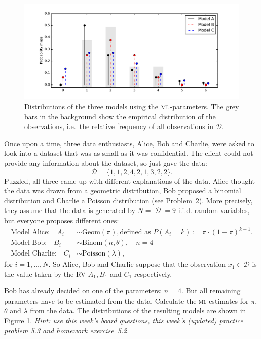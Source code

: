 \documentclass[a4paper,10pt,landscape,twocolumn]{scrartcl}
\begin{document}
\begin{figure}
	\includegraphics[width=.5\textwidth]{05-distributions}
	\caption{Distributions of the three models using the $\textsc{ml}$-parameters. The grey bars in the background show the empirical distribution of the observations, i.e.\ the relative frequency of all observations in $\mathcal{D}$.\label{fig:models}}
\end{figure}


\begin{exercise}
Once upon a time, three data enthusiasts, Alice, Bob and Charlie, were asked to look into a dataset that was as small as it was confidential. The client could not provide any information about the dataset, so just gave the data:
	\[
		\mathcal{D} = \{ 1, 1, 2, 4, 2, 1, 3, 2, 2 \}.
	\]
	Puzzled, all three came up with different explanations of the data. Alice thought the data was drawn from a geometric distribution, Bob proposed a binomial distribution and Charlie a Poisson distribution (see Problem~2). More precisely, they assume that the data is generated by $N = |\mathcal D|=9$ i.i.d. random variables, but everyone proposes different ones:
	\begin{align*}
		\text{Model Alice:} \quad A_i &\sim \text{Geom}(\pi), \mbox{defined as $P(A_i=k):=\pi \cdot (1-\pi)^{k-1}$.}\\
		\text{Model Bob:} \quad B_i &\sim \text{Binom}(n, \theta), \quad n=4\\
		\text{Model Charlie:} \quad C_i &\sim \text{Poisson}(\lambda),
	\end{align*}
	for $i = 1, \dots, N$. So Alice, Bob and Charlie suppose that the observation $x_1 \in \mathcal D$ is the value taken by the RV $A_1, B_1$ and $C_1$ respectively.
	
	\begin{subex}[1pt]
	Bob has already decided on one of the parameters: $n=4$. But all remaining parameters have to be estimated from the data. Calculate the \textsc{ml}-estimates for $\pi$, $\theta$ and $\lambda$ from the data. The distributions of the resulting models are shown in Figure \ref{fig:models}. 
	\emph{Hint: use this week's board questions, this week's (updated) practice problem 5.3 and homework exercise~5.2}.
	\end{subex}
	

\end{exercise}
\end{document}
